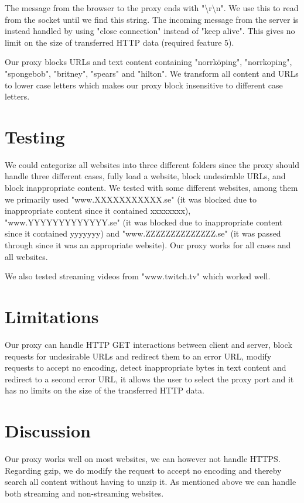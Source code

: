\documentclass[10pt]{article}
\begin{document}
The message from the browser to the proxy ends with
"\textbackslash r\textbackslash n". We use this to read from the socket until
we find this string. The incoming message from the server is instead handled by
using "close connection" instead of "keep alive". This gives no limit on the
size of transferred HTTP data (required feature 5).

Our proxy blocks URLs and text content containing "norrk\"oping", "norrkoping",
"spongebob", "britney", "spears" and "hilton". We transform all content and
URLs to lower case letters which makes our proxy block insensitive to different
case letters.

\section{Testing}
We could categorize all websites into three different folders since the
proxy should handle three different cases, fully load a website,
block undesirable URLs, and block inappropriate content. We tested with some
different websites, among them we primarily used "www.XXXXXXXXXXX.se"
(it was blocked due to inappropriate content since it contained xxxxxxxx),
"www.YYYYYYYYYYYYY.se" (it was blocked due to inappropriate content since it
contained yyyyyyy) and "www.ZZZZZZZZZZZZZZ.se" (it was passed through since
it was an appropriate website). Our proxy works for all cases and all websites.

We also tested streaming videos from "www.twitch.tv" which worked well.

\section{Limitations}
Our proxy can handle HTTP GET interactions between client and server,
block requests for undesirable URLs and redirect them to an error URL,
modify requests to accept no encoding, detect inappropriate bytes in text
content and redirect to a second error URL, it allows the user to select the
proxy port and it has no limits on the size of the transferred HTTP data.

\section{Discussion}
Our proxy works well on most websites, we can however not handle HTTPS.
Regarding gzip, we do modify the request to accept no encoding and thereby
search all content without having to unzip it. As mentioned above we can
handle both streaming and non-streaming websites.
\end{document}
